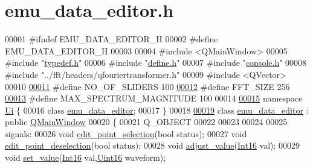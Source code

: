 \hypertarget{a00094_source}{\section{emu\+\_\+data\+\_\+editor.\+h}
\label{a00094_source}
}

\begin{DoxyCode}
00001 \textcolor{preprocessor}{#ifndef EMU\_DATA\_EDITOR\_H}
00002 \textcolor{preprocessor}{#define EMU\_DATA\_EDITOR\_H}
00003 
00004 \textcolor{preprocessor}{#include <QMainWindow>}
00005 \textcolor{preprocessor}{#include "\hyperlink{a00004}{typedef.h}"}
00006 \textcolor{preprocessor}{#include "\hyperlink{a00090}{define.h}"}
00007 \textcolor{preprocessor}{#include "\hyperlink{a00088}{console.h}"}
00008 \textcolor{preprocessor}{#include "../fft/headers/qfouriertransformer.h"}
00009 \textcolor{preprocessor}{#include <QVector>}
00010 
\hypertarget{a00094_source_l00011}{}\hyperlink{a00094_a958de936b60eb9d784cdb10be7d39373}{00011} \textcolor{preprocessor}{#define     NO\_OF\_SLIDERS            100}
\hypertarget{a00094_source_l00012}{}\hyperlink{a00094_a636ddc19af00bc87969a07c88331f105}{00012} \textcolor{preprocessor}{#define     FFT\_SIZE                 256}
\hypertarget{a00094_source_l00013}{}\hyperlink{a00094_a60ece807960441ee99b05b2e536cad76}{00013} \textcolor{preprocessor}{#define     MAX\_SPECTRUM\_MAGNITUDE   100}
00014 
\hypertarget{a00094_source_l00015}{}\hyperlink{a00145}{00015} \textcolor{keyword}{namespace }\hyperlink{a00145}{Ui} \{
00016 \textcolor{keyword}{class }\hyperlink{a00009}{emu\_data\_editor};
00017 \}
00018 
\hypertarget{a00094_source_l00019}{}\hyperlink{a00008}{00019} \textcolor{keyword}{class }\hyperlink{a00008}{emu\_data\_editor} : \textcolor{keyword}{public} \hyperlink{a00058}{QMainWindow}
00020 \{
00021     Q\_OBJECT
00022 
00023 
00024 
00025 signals:
00026      \textcolor{keywordtype}{void} \hyperlink{a00008_a9aa2af0c329358fd96f7fb6b7f02bfe1}{edit\_point\_selection}(\textcolor{keywordtype}{bool} status);
00027      \textcolor{keywordtype}{void} \hyperlink{a00008_a2b9629d20c2b97c01bf8486c89fd0148}{edit\_point\_deselection}(\textcolor{keywordtype}{bool} status);
00028      \textcolor{keywordtype}{void} \hyperlink{a00008_a74d292de22b341313df1852cb1033704}{adjust\_value}(\hyperlink{a00004_a3985266aecb120f269789241c170850c}{Int16} val);
00029      \textcolor{keywordtype}{void} \hyperlink{a00008_a9d26460f253a29dd961b20be0afb5358}{set\_value}(\hyperlink{a00004_a3985266aecb120f269789241c170850c}{Int16} val,\hyperlink{a00004_aae7407b021d43f7193a81a58cfb3e297}{Uint16} waveform);

\end{DoxyCode}
